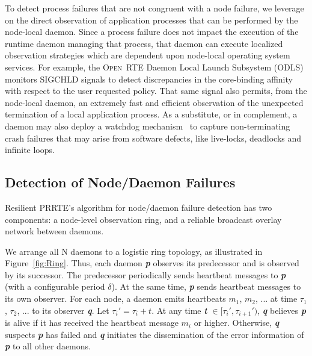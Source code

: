 \documentclass[sigconf]{acmart}
\newcommand{\prrte}[0]{\textsc{PRRTE}\xspace}
\newcommand{\orte}[0]{\textsc{Open~RTE}\xspace}
\begin{document}
To detect process failures that are not congruent with a node failure, we 
leverage on the direct observation of application processes that can be 
performed by the node-local daemon. Since a process failure does not 
impact the execution of the runtime daemon managing that process, that 
daemon can execute localized observation strategies which are dependent 
upon node-local operating system services. For example, the \orte Daemon 
Local Launch Subsystem (ODLS) monitors SIGCHLD signals to detect discrepancies 
in the core-binding affinity with respect to the user requested policy.
That same signal also permits, from the node-local daemon, an extremely fast and efficient observation
of the unexpected termination of a local application process. As a substitute, 
or in complement, a daemon may also deploy a watchdog mechanism~\cite{CASTAIN18} 
to capture non-terminating crash failures that may arise from software 
defects, like live-locks, deadlocks and infinite loops. 

\subsection{Detection of Node/Daemon Failures}

Resilient \prrte's algorithm for node/daemon failure detection has two
components: a node-level observation ring, and a reliable broadcast overlay network between daemons.

We arrange all N daemons to a logistic ring topology, as illustrated in Figure~\ref{fig:Ring}.
Thus, each daemon \textbf{\textit{p}} observes its predecessor and is observed by 
its successor. The predecessor periodically sends heartbeat messages to \textbf{\textit{p}} (with a 
configurable period $\delta$). At the same time, \textbf{\textit{p}} sends heartbeat messages to its own observer. For each node, a daemon emits heartbeats $m_1$, $m_2$, ... at time $\tau_1$, $\tau_2$, ... to its observer \textbf{\textit{q}}. Let $\tau_i' = \tau_i + t$. At any time \textbf{\textit{t}} $\in [\tau_i', \tau_{i+1}')$, \textbf{\textit{q}} believes \textbf{\textit{p}} is alive if it has received the 
heartbeat message $m_i$ or higher. Otherwise, \textbf{\textit{q}} suspects \textbf{\textit{p}} has failed and \textbf{\textit{q}} initiates the dissemination of the error information of \textbf{\textit{p}} to all 
other daemons.
\end{document}
